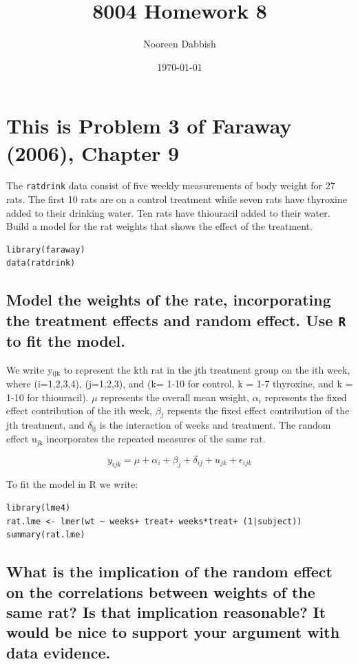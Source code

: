 \documentclass[11pt]{article}
\title{8004 Homework 8}
\author{Nooreen Dabbish}
\date{\today}
\begin{document}
\maketitle




\section{This is Problem 3 of Faraway (2006), Chapter 9}
\label{sec-1}


The \verb~ratdrink~ data consist of five weekly measurements of body
weight for 27 rats. The first 10 rats are on a control treatment
while seven rats have thyroxine added to their drinking water. Ten
rats have thiouracil added to their water. Build a model for the rat
weights that shows the effect of the treatment.


\begin{verbatim}
library(faraway)
data(ratdrink)
\end{verbatim}
\subsection{Model the weights of the rate, incorporating the treatment effects and random effect. Use \verb~R~ to fit the model.}
\label{sec-1-1}


We write y$_{\mathrm{ijk}}$ to represent the kth rat in the jth treatment group
on the ith week, where (i=1,2,3,4), (j=1,2,3), and (k= 1-10 for
control, k = 1-7 thyroxine, and k = 1-10 for thiouracil). $\mu$
represents the overall mean weight, $\alpha$$_i$ represents the fixed
effect contribution of the ith week, $\beta$$_j$ repsents the fixed
effect contribution of the jth treatment, and $\delta$$_{\mathrm{ij}}$ is the
interaction of weeks and treatment. The random effect u$_{\mathrm{jk}}$
incorporates the repeated measures of the same rat.

$$y_{ijk} = \mu + \alpha_i + \beta_j + \delta_{ij} + u_{jk} + \epsilon_{ijk}$$




To fit the model in R we write:


\begin{verbatim}
library(lme4)
rat.lme <- lmer(wt ~ weeks+ treat+ weeks*treat+ (1|subject))
summary(rat.lme)
\end{verbatim}
\subsection{What is the implication of the random effect on the correlations between weights of the same rat? Is that implication reasonable? It would be nice to support your argument with data evidence.}
\label{sec-1-2}
\end{document}
